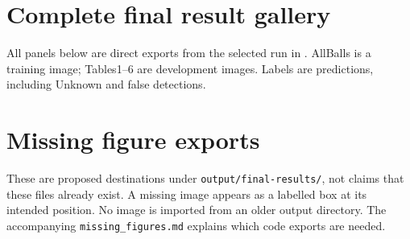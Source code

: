 \documentclass[12pt,a4paper]{article}
\begin{document}
\clearpage\appendix
\section{Complete final result gallery}\label{app:gallery}
All panels below are direct exports from the selected run in . AllBalls is a training image; Tables1--6 are development images. Labels are predictions, including Unknown and false detections.

\clearpage
\section{Missing figure exports}\label{app:missing}
These are proposed destinations under \texttt{output/final-results/}, not claims that these files already exist. A missing image appears as a labelled box at its intended position. No image is imported from an older output directory. The accompanying \texttt{missing\_figures.md} explains which code exports are needed.

\end{document}

